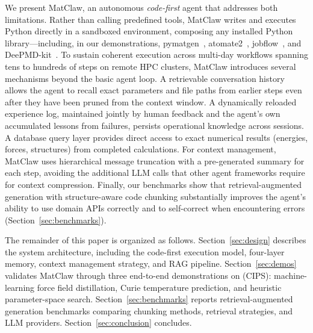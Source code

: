 \documentclass{article}
\begin{document}
We present MatClaw, an autonomous \emph{code-first} agent that addresses both limitations.
Rather than calling predefined tools, MatClaw writes and executes Python directly in a sandboxed environment, composing any installed Python library---including, in our demonstrations,
pymatgen~\citep{Ong2013},
atomate2~\citep{Ganose2025},
jobflow~\citep{Rosen2024}, and
DeePMD-kit~\citep{Zhang2018dpmd}.
To sustain coherent execution across multi-day workflows spanning tens to hundreds of steps on remote HPC clusters, MatClaw introduces several mechanisms beyond the basic agent loop.
A retrievable conversation history allows the agent to recall exact parameters and file paths from earlier steps even after they have been pruned from the context window.
A dynamically reloaded experience log, maintained jointly by human feedback and the agent's own accumulated lessons from failures, persists operational knowledge across sessions.
A database query layer provides direct access to exact numerical results (energies, forces, structures) from completed calculations.
For context management, MatClaw uses hierarchical message truncation with a pre-generated summary for each step, avoiding the additional LLM calls that other agent frameworks require for context compression.
Finally, our benchmarks show that retrieval-augmented generation with structure-aware code chunking substantially improves the agent's ability to use domain APIs correctly and to self-correct when encountering errors (Section~\ref{sec:benchmarks}).

The remainder of this paper is organized as follows.
Section~\ref{sec:design} describes the system architecture, including the code-first execution model, four-layer memory, context management strategy, and RAG pipeline.
Section~\ref{sec:demos} validates MatClaw through three end-to-end demonstrations on  (CIPS): machine-learning force field distillation, Curie temperature prediction, and heuristic parameter-space search.
Section~\ref{sec:benchmarks} reports retrieval-augmented generation benchmarks comparing chunking methods, retrieval strategies, and LLM providers.
Section~\ref{sec:conclusion} concludes.
\end{document}

